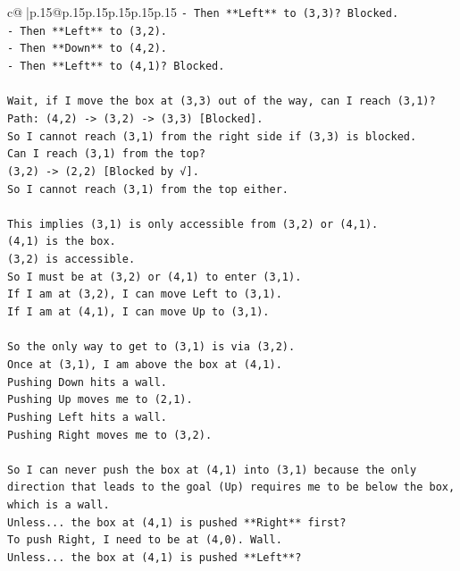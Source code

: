 \documentclass{article}
\begin{document}
{\begin{supertabular}{c@{$\;$}|p{.15\linewidth}@{}p{.15\linewidth}p{.15\linewidth}p{.15\linewidth}p{.15\linewidth}p{.15\linewidth}}
{{{\texttt{{-} Then **Left** to (3,3)? Blocked.} \\
\texttt{{-} Then **Left** to (3,2).} \\
\texttt{{-} Then **Down** to (4,2).} \\
\texttt{{-} Then **Left** to (4,1)? Blocked.} \\
\\ 
\texttt{Wait, if I move the box at (3,3) out of the way, can I reach (3,1)?} \\
\texttt{Path: (4,2) {-}> (3,2) {-}> (3,3) {[}Blocked{]}.} \\
\texttt{So I cannot reach (3,1) from the right side if (3,3) is blocked.} \\
\texttt{Can I reach (3,1) from the top?} \\
\texttt{(3,2) {-}> (2,2) {[}Blocked by √{]}.} \\
\texttt{So I cannot reach (3,1) from the top either.} \\
\\ 
\texttt{This implies (3,1) is only accessible from (3,2) or (4,1).} \\
\texttt{(4,1) is the box.} \\
\texttt{(3,2) is accessible.} \\
\texttt{So I must be at (3,2) or (4,1) to enter (3,1).} \\
\texttt{If I am at (3,2), I can move Left to (3,1).} \\
\texttt{If I am at (4,1), I can move Up to (3,1).} \\
\\ 
\texttt{So the only way to get to (3,1) is via (3,2).} \\
\texttt{Once at (3,1), I am above the box at (4,1).} \\
\texttt{Pushing Down hits a wall.} \\
\texttt{Pushing Up moves me to (2,1).} \\
\texttt{Pushing Left hits a wall.} \\
\texttt{Pushing Right moves me to (3,2).} \\
\\ 
\texttt{So I can never push the box at (4,1) into (3,1) because the only direction that leads to the goal (Up) requires me to be below the box, which is a wall.} \\
\texttt{Unless... the box at (4,1) is pushed **Right** first?} \\
\texttt{To push Right, I need to be at (4,0). Wall.} \\
\texttt{Unless... the box at (4,1) is pushed **Left**?} \\
}}}
\end{supertabular}}
\end{document}
